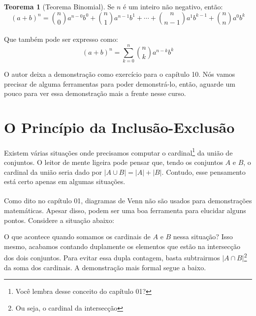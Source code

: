 \documentclass[a4paper,11pt]{book}
\theoremstyle{definition}
\theoremstyle{break}
\newtheorem{theorem}{Teorema}
\begin{document}
\begin{theorem}[Teorema Binomial]
Se $n$ é um inteiro não negativo, então:
$$(a+b)^n = {n \choose 0}a^{n-0}b^{0} + {n \choose 1}a^{n-1}b^1 + \cdots + {n \choose n-1}a^1b^{k-1} + {n \choose n}a^{0}b^k $$
\\
Que também pode ser expresso como:
$$(a+b)^n = \sum\limits_{k=0}^n {n \choose k}a^{n-k}b^k$$
\end{theorem}

O autor deixa a demonstração como exercício para o capítulo 10. Nós vamos precisar de alguma ferramentas para poder demonstrá-lo, então, aguarde um pouco para ver essa demonstração mais a frente nesse curso.

\section{O Princípio da Inclusão-Exclusão}

Existem várias situações onde precisamos computar o cardinal\footnote{Você lembra desse conceito do capítulo 01?} da união de conjuntos. O leitor de mente ligeira pode pensar que, tendo os conjuntos $A$ e $B$, o cardinal da união seria dado por $|A \cup B| = |A| + |B|$. Contudo, esse pensamento está certo apenas em algumas situações.
\\
\\
Como dito no capítulo 01, diagramas de Venn não são usados para demonstrações matemáticas. Apesar disso, podem ser uma boa ferramenta para elucidar alguns pontos. Considere a situação abaixo:

\begin{center}
\end{center}

O que acontece quando somamos os cardinais de $A$ e $B$ nessa situação? Isso mesmo, acabamos contando duplamente os elementos que estão na intersecção dos dois conjuntos. Para evitar essa dupla contagem, basta subtrairmos $|A \cap B|$\footnote{Ou seja, o cardinal da intersecção} da soma dos cardinais. A demonstração mais formal segue a baixo.
\end{document}
